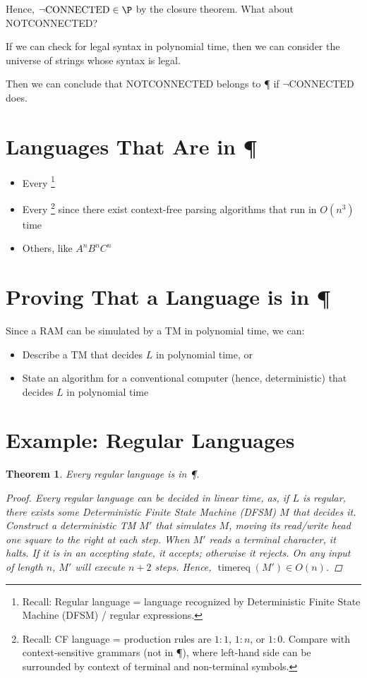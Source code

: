 \documentclass[a4paper]{report}
\newtheorem{theo}{Theorem}
\newcommand{\bookref}[3]{\marginpar{\faBook{}~#1\\Chapter #2\\Section #3}}
\theoremstyle{definition}
\DeclareMathOperator*{\treq}{timereq}
\begin{document}
Hence, $\neg\text{CONNECTED} \in \P$ by the closure theorem.  What about NOTCONNECTED?

If we can check for legal syntax in polynomial time, then we can consider the universe of strings whose syntax is legal.

Then we can conclude that $\text{NOTCONNECTED}$ belongs to \P{} if $\neg\text{CONNECTED}$ does.

\section{Languages That Are in \P}
\bookref{ER}{28}{28.1.2}
\begin{itemize}
\item Every \footnote{Recall: Regular language = language recognized by Deterministic Finite State Machine (DFSM) / regular expressions.}
\item Every \footnote{Recall: CF language = production rules are $1:1$, $1:n$, or $1:0$. Compare with context-sensitive grammars (not in \P), where left-hand side can be surrounded by context of terminal and non-terminal symbols.} since there exist context-free parsing algorithms that run in $O(n^3)$ time
\item Others, like $A^nB^nC^n$
\end{itemize}

\section{Proving That a Language is in \P}
Since a RAM can be simulated by a TM in polynomial time, we can:
\begin{itemize}
\item Describe a TM that decides $L$ in polynomial time, or
\item State an algorithm for a conventional computer (hence, deterministic) that decides $L$ in polynomial time
\end{itemize}

\section{Example: Regular Languages}
\bookref{ER}{28}{28.1.3}
\begin{theo}
Every regular language is in \P.
\begin{proof}
Every regular language can be decided in linear time, as, if $L$ is regular, there exists some Deterministic Finite State Machine (DFSM) $M$ that decides it.  Construct a deterministic TM $M'$ that simulates $M$, moving its read/write head one square to the right at each step.  When $M'$ reads a terminal character, it halts. If it is in an accepting state, it accepts; otherwise it rejects. On any input of length $n$, $M'$ will execute $n + 2$ steps. Hence, $\treq(M') \in O(n)$.
\end{proof}
\end{theo}
\end{document}
